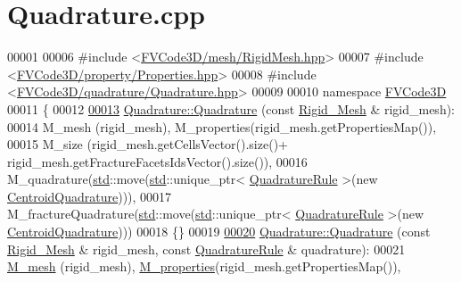\hypertarget{Quadrature_8cpp_source}{}\section{Quadrature.\+cpp}
\label{Quadrature_8cpp_source}

\begin{DoxyCode}
00001 
00006 \textcolor{preprocessor}{#include <\hyperlink{RigidMesh_8hpp}{FVCode3D/mesh/RigidMesh.hpp}>}
00007 \textcolor{preprocessor}{#include <\hyperlink{Properties_8hpp}{FVCode3D/property/Properties.hpp}>}
00008 \textcolor{preprocessor}{#include <\hyperlink{Quadrature_8hpp}{FVCode3D/quadrature/Quadrature.hpp}>}
00009 
00010 \textcolor{keyword}{namespace }\hyperlink{namespaceFVCode3D}{FVCode3D}
00011 \{
00012 
\hypertarget{Quadrature_8cpp_source.tex_l00013}{}\hyperlink{classFVCode3D_1_1Quadrature_aefb925716304b6546c5aeba01fab383a}{00013} \hyperlink{classFVCode3D_1_1Quadrature_aefb925716304b6546c5aeba01fab383a}{Quadrature::Quadrature} (\textcolor{keyword}{const} \hyperlink{classFVCode3D_1_1Rigid__Mesh}{Rigid\_Mesh} & rigid\_mesh):
00014      M\_mesh (rigid\_mesh), M\_properties(rigid\_mesh.getPropertiesMap()),
00015      M\_size (rigid\_mesh.getCellsVector().size()+ rigid\_mesh.getFractureFacetsIdsVector().size()),
00016      M\_quadrature(\hyperlink{namespacestd}{std}::move(\hyperlink{namespacestd}{std}::unique\_ptr< \hyperlink{classFVCode3D_1_1QuadratureRule}{QuadratureRule} >(new 
      \hyperlink{classFVCode3D_1_1CentroidQuadrature}{CentroidQuadrature}))),
00017      M\_fractureQuadrature(\hyperlink{namespacestd}{std}::move(\hyperlink{namespacestd}{std}::unique\_ptr< \hyperlink{classFVCode3D_1_1QuadratureRule}{QuadratureRule} >(new 
      \hyperlink{classFVCode3D_1_1CentroidQuadrature}{CentroidQuadrature})))
00018 \{\}
00019 
\hypertarget{Quadrature_8cpp_source.tex_l00020}{}\hyperlink{classFVCode3D_1_1Quadrature_a9187a5705b15af6384771bc2e153b175}{00020} \hyperlink{classFVCode3D_1_1Quadrature_aefb925716304b6546c5aeba01fab383a}{Quadrature::Quadrature} (\textcolor{keyword}{const} \hyperlink{classFVCode3D_1_1Rigid__Mesh}{Rigid\_Mesh} & rigid\_mesh, \textcolor{keyword}{const} 
      \hyperlink{classFVCode3D_1_1QuadratureRule}{QuadratureRule} & quadrature):
00021     \hyperlink{classFVCode3D_1_1Quadrature_abaa2519ea32065df30242bd5f5cb2d01}{M\_mesh} (rigid\_mesh), \hyperlink{classFVCode3D_1_1Quadrature_ace6cd23087209d3186ae173c265cde39}{M\_properties}(rigid\_mesh.getPropertiesMap()),

\end{DoxyCode}
